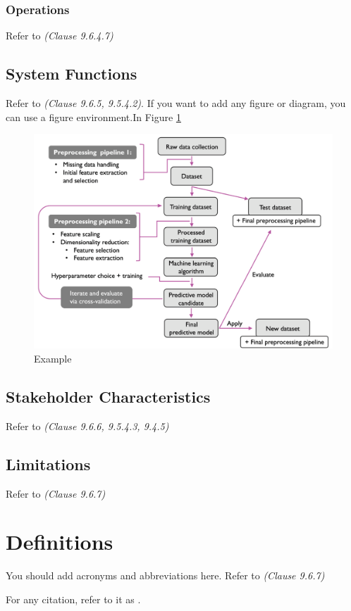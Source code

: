 \subsubsection{Operations}
Refer to \textit{(Clause 9.6.4.7)}

\subsection{System Functions}

Refer to \textit{(Clause 9.6.5, 9.5.4.2)}. If you want to add any figure or diagram, you can use a figure environment.In Figure \ref{Fig:Example}

\begin{figure}[ht]
\centering
\includegraphics[width=.9 \textwidth]{Figures/ExampleFigure.png}
\caption{Example \label{Fig:Example}}
\end{figure}


\subsection{Stakeholder Characteristics}

Refer to \textit{(Clause 9.6.6, 9.5.4.3, 9.4.5)}

\subsection{Limitations}

Refer to \textit{(Clause 9.6.7)}

\section{Definitions}

You should add acronyms and abbreviations here. Refer to \textit{(Clause 9.6.7)}



For any citation, refer to it as \cite{younis2021hybrid}.
